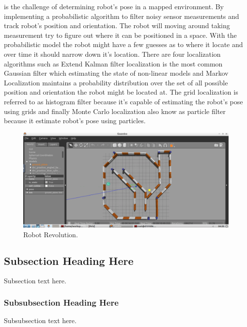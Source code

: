 \documentclass[10pt,journal,compsoc]{IEEEtran}
\begin{document}
 is the challenge of determining robot's pose in a mapped environment. By implementing a probabilistic algorithm to filter noisy sensor measurements
 and track robot's position and orientation. The robot will moving around taking measurement try to figure out where it can be positioned in a space. With the probabilistic model the robot might have a few guesses as to where it locate and over time it should narrow down it's location. There are four localization algorithms such as Extend Kalman filter localization is the most common Gaussian filter which estimating the state of non-linear models and Markov Localization maintains a probability distribution over the set of all possible position and orientation the robot might be located at. The grid localization is referred to as histogram filter because it's capable of estimating the robot's pose using grids and finally Monte Carlo localization also know as particle filter because it estimate robot's pose using particles.
\begin{figure}[thpb]
      \centering
      \includegraphics[width=\linewidth]{MapRobot.png}
      \caption{Robot Revolution.}
      \label{fig:robot1}
\end{figure}

\subsection{Subsection Heading Here}
Subsection text here.

\subsubsection{Subsubsection Heading Here}
Subsubsection text here.
\end{document}
